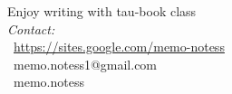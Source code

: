 \documentclass[10pt,a4paper,twoside]{tau-book}
\begin{document}
\begin{center}
	Enjoy writing with tau-book class \faGrinBeam[regular] \\ 
	\vskip10pt
	\textit{Contact:} \\
	\faLink\ \href{https://sites.google.com/view/memo-notess/p%C3%A1gina-principal}{https://sites.google.com/memo-notess} \\
	\faEnvelope[regular]\ memo.notess1@gmail.com \\
	\faInstagram\ memo.notess 
\end{center}
					

\printbibliography

\end{document}
